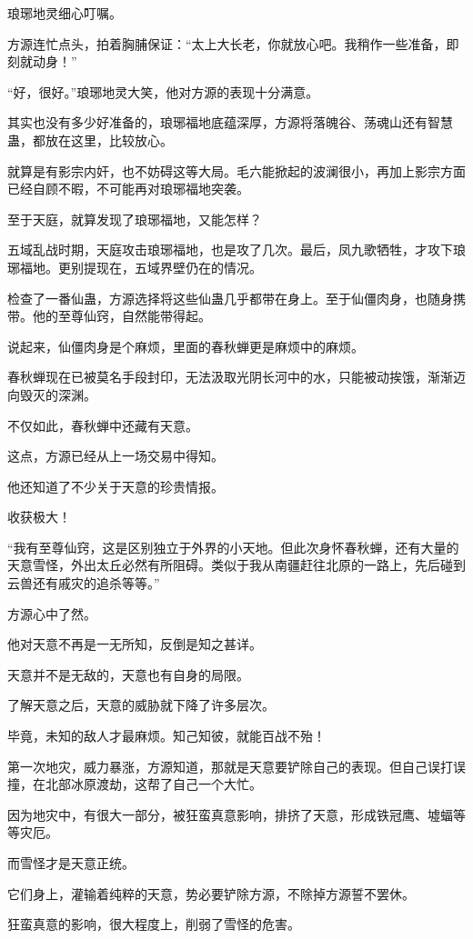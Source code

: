\begin{this_body}
琅琊地灵细心叮嘱。

方源连忙点头，拍着胸脯保证：“太上大长老，你就放心吧。我稍作一些准备，即刻就动身！”

“好，很好。”琅琊地灵大笑，他对方源的表现十分满意。

其实也没有多少好准备的，琅琊福地底蕴深厚，方源将落魄谷、荡魂山还有智慧蛊，都放在这里，比较放心。

就算是有影宗内奸，也不妨碍这等大局。毛六能掀起的波澜很小，再加上影宗方面已经自顾不暇，不可能再对琅琊福地突袭。

至于天庭，就算发现了琅琊福地，又能怎样？

五域乱战时期，天庭攻击琅琊福地，也是攻了几次。最后，凤九歌牺牲，才攻下琅琊福地。更别提现在，五域界壁仍在的情况。

检查了一番仙蛊，方源选择将这些仙蛊几乎都带在身上。至于仙僵肉身，也随身携带。他的至尊仙窍，自然能带得起。

说起来，仙僵肉身是个麻烦，里面的春秋蝉更是麻烦中的麻烦。

春秋蝉现在已被莫名手段封印，无法汲取光阴长河中的水，只能被动挨饿，渐渐迈向毁灭的深渊。

不仅如此，春秋蝉中还藏有天意。

这点，方源已经从上一场交易中得知。

他还知道了不少关于天意的珍贵情报。

收获极大！

“我有至尊仙窍，这是区别独立于外界的小天地。但此次身怀春秋蝉，还有大量的天意雪怪，外出太丘必然有所阻碍。类似于我从南疆赶往北原的一路上，先后碰到云兽还有戚灾的追杀等等。”

方源心中了然。

他对天意不再是一无所知，反倒是知之甚详。

天意并不是无敌的，天意也有自身的局限。

了解天意之后，天意的威胁就下降了许多层次。

毕竟，未知的敌人才最麻烦。知己知彼，就能百战不殆！

第一次地灾，威力暴涨，方源知道，那就是天意要铲除自己的表现。但自己误打误撞，在北部冰原渡劫，这帮了自己一个大忙。

因为地灾中，有很大一部分，被狂蛮真意影响，排挤了天意，形成铁冠鹰、墟蝠等等灾厄。

而雪怪才是天意正统。

它们身上，灌输着纯粹的天意，势必要铲除方源，不除掉方源誓不罢休。

狂蛮真意的影响，很大程度上，削弱了雪怪的危害。


\end{this_body}
